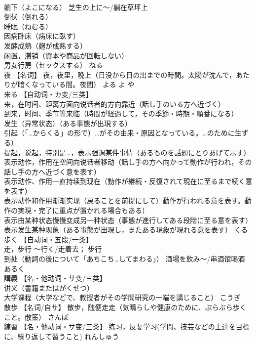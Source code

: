\documentclass[8pt]{extreport}
\begin{document}
\begin{CJK}{UTF8}{min}
\\	躺下（よこになる） 芝生の上に〜/躺在草坪上 
\\	倒伏（倒れる） 
\\	睡眠（ねむる） 
\\	因病卧床（病床に臥す） 
\\	发酵成熟（麹が成熟する） 
\\	闲置，滞销（資本や商品が回転しない） 
\\	男女行房（セックスする）	ねる	
\\	夜	【名词】 夜，夜里，晚上（日没から日の出までの時間。太陽が沈んで，あたりが暗くなっている間。夜間）	よる よ や	
\\	来る	【自动词・カ变/三类】 
\\	来，在时间、距离方面向说话者的方向靠近（話し手のいる方へ近づく） 
\\	到来，时间、季节等来临（時間が経過して，その季節・時期・順番になる） 
\\	发生（异常状态）（ある事態が出現する） 
\\	引起（「…からくる」の形で）…がその由来・原因となっている。…のために生ずる） 
\\	提起，说起，特别是…，表示强调某件事情（あるものを話題にとりあげて示す） 
\\	表示动作，作用在空间向说话者移动（話し手の方へ向かって動作が行われ，その話し手の方へ近づく意を表す） 
\\	表示动作、作用一直持续到现在（動作が継続・反復されて現在に至るまで続く意を表す） 
\\	表示动作和作用渐渐实现（戻ることを前提にして）動作が行われる意を表す。動作の実現・完了に重点が置かれる場合もある） 
\\	表示由某种状态慢慢变成另一种状态（事態が進行してある段階に至る意を表す） 
\\	表示发生某种现象（ある事態が出現し，またある現象が現れる意を表す）	くる	
\\	歩く	【自动词・五段/一类】 
\\	走，步行 ～行く/走着去； 步行 
\\	到处（動詞の後について「あちこち…してまわる」） 酒場を飲み～/串酒馆喝酒	あるく	
\\	講義	【名・他动词・サ变/三类】 
\\	讲义（書籍またはがくせつ） 
\\	大学课程（大学などで、教授者がその学問研究の一端を講じること）	こうぎ	
\\	散歩	【名词/自サ】 散步，随便走走（気晴らしや健康のために、ぶらぶら歩くこと。散策）	さんぽ	
\\	練習	【名・他动词・サ变/三类】 练习，反复学习(学問、技芸などの上達を目標に、繰り返して習うこと)	れんしゅう	

\end{CJK}
\end{document}
